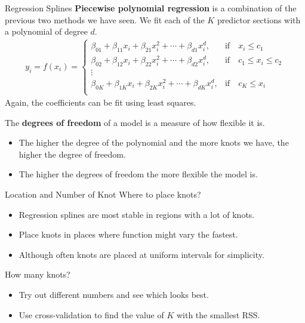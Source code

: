 \documentclass[
  ignorenonframetext,
  aspectratio=169,
]{beamer}
\begin{document}
\begin{frame}{Regression Splines}
\protect\hypertarget{regression-splines}{}
\textbf{Piecewise polynomial regression} is a combination of the
previous two methods we have seen. We fit each of the \(K\) predictor
sections with a polynomial of degree \(d\). \[
\begin{aligned}
y_i = f(x_i) =\left\{\begin{array}{cl}
\beta_{01} + \beta_{11}x_i + \beta_{21}x_i^2 + \cdots + \beta_{d1}x_i^d, & \text{if} \quad x_i \leq c_1 \\
\beta_{02} + \beta_{12}x_i + \beta_{22}x_i^2 + \cdots + \beta_{d2}x_i^d, & \text{if} \quad c_1 \leq x_i \leq c_2 \\
\vdots \\
\beta_{0K} + \beta_{1K}x_i + \beta_{2K}x_i^2 + \cdots + \beta_{dK}x_i^d, & \text{if} \quad c_K \leq x_i \\
\end{array}\right.
\end{aligned}
\] Again, the coefficients can be fit using least squares.

The \textbf{degrees of freedom} of a model is a measure of how flexible
it is.

\begin{itemize}
\item
  The higher the degree of the polynomial and the more knots we have,
  the higher the degree of freedom.
\item
  The higher the degrees of freedom the more flexible the model is.
\end{itemize}
\end{frame}

\begin{frame}{Location and Number of Knot}
\protect\hypertarget{location-and-number-of-knot}{}
Where to place knots?

\begin{itemize}
\item
  Regression splines are most stable in regions with a lot of knots.
\item
  Place knots in places where function might vary the fastest.
\item
  Although often knots are placed at uniform intervals for simplicity.
\end{itemize}

How many knots?

\begin{itemize}
\item
  Try out different numbers and see which looks best.
\item
  Use cross-validation to find the value of \(K\) with the smallest RSS.
\end{itemize}
\end{frame}
\end{document}
